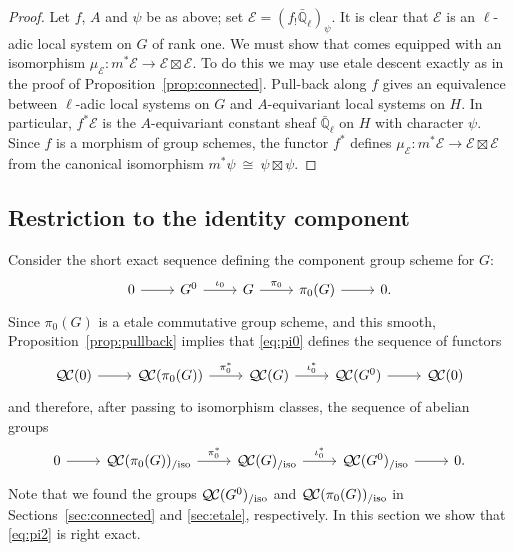 \documentclass{amsart}
\theoremstyle{plain}
\theoremstyle{definition}
\theoremstyle{remark}
\newcommand{\EE}{\mathbb{\bar Q}_\ell}
\newcommand{\iso}{{\ \cong\ }}
\newcommand{\qcs}[1]{{\mathcal{#1}}}
\newcommand{\QC}{{\mathcal{Q\hskip-0.8pt C}}}
\newcommand{\QCiso}[1]{\QC(#1)_{/\text{iso}}}
\begin{document}
\begin{proof}
Let $f$, $A$ and $\psi$ be as above; set $\qcs{E} = (f_! \EE)_\psi$.
It is clear that $\qcs{E}$ is an $\ell$-adic local system on $G$ of rank one.
We must show that comes equipped with an isomorphism $\mu_\qcs{E} : m^* \qcs{E} \to \qcs{E}\boxtimes\qcs{E}$.
To do this we may use etale descent exactly as in the proof of Proposition~\ref{prop:connected}. 
Pull-back along $f$ gives an equivalence between $\ell$-adic local systems on $G$ and $A$-equivariant local systems on $H$. 
In particular, $f^*\qcs{E}$ is the $A$-equivariant constant sheaf $\EE$ on $H$ with character $\psi$.
Since $f$ is a morphism of group schemes, the functor $f^*$ defines $\mu_\qcs{E} : m^*\qcs{E} \to \qcs{E}\boxtimes\qcs{E}$ from the canonical isomorphism $m^*\psi \iso \psi \boxtimes\psi$.
\end{proof}

\subsection{Restriction to the identity component} \label{sec:restriction}

Consider the short exact sequence
defining the component group scheme for $G$:
\begin{equation}\label{eq:pi0}
\begin{tikzcd}
0 \rar & G^0 \arrow{r}{\iota_0} & G \arrow{r}{\pi_0} & \pi_0(G) \rar & 0.
\end{tikzcd}
\end{equation}
Since $\pi_0(G)$ is a etale commutative group scheme, and this smooth,
Proposition~\ref{prop:pullback} implies that \eqref{eq:pi0} defines the sequence of functors
\begin{equation}\label{eq:pi1}
\begin{tikzcd}
\QC(0) \rar & \QC(\pi_0(G)) \arrow{r}{\pi_0^*} & \QC(G) \arrow{r}{\iota_0^*} & \QC(G^0) \rar & \QC(0)
\end{tikzcd}
\end{equation}
and therefore, after passing to isomorphism classes, the sequence of abelian groups
\begin{equation}\label{eq:pi2}
\begin{tikzcd}
0 \rar &
\QCiso{\pi_0(G)} \arrow{r}{\pi_0^*} & \QCiso{G} \arrow{r}{\iota_0^*} & \QCiso{G^0} \rar & 0.
\end{tikzcd}
\end{equation}
 Note that we found the groups $\QCiso{G^0}$
and $\QCiso{\pi_0(G)}$
in Sections~\ref{sec:connected} and \ref{sec:etale}, respectively.
In this section we show that \eqref{eq:pi2} is right exact.
\end{document}
